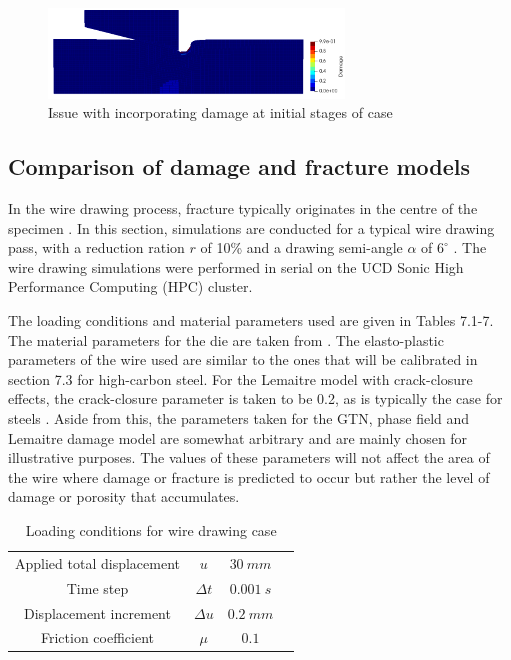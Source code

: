 \documentclass[sn-mathphys,Numbered,draft]{sn-jnl}%
\begin{document}
\begin{figure}[htb]
\begin{center}
	\includegraphics[width=0.7\textwidth]{./Figures/SimulationAndAnalysis/damageIssue.png}
\caption{Issue with incorporating damage at initial stages of case}
\label{fig:notchedRoundBAr}
\end{center}
\end{figure}

\FloatBarrier

\subsection{Comparison of damage and fracture models}

In the wire drawing process, fracture typically originates in the centre of the specimen \cite{gonzalez_assessment_2018,norasethasopon_prediction_2008,hoffmanner_selection_1971,choi_study_2010}. In this section, simulations are conducted for a typical wire drawing pass, with a reduction ration $r$ of 10\% and a drawing semi-angle $\alpha$ of $6^{\circ}$ \cite{roh_process_2021}. The wire drawing simulations were performed in serial on the UCD Sonic High Performance Computing (HPC) cluster.

The loading conditions and material parameters used are given in Tables 7.1-7. The material parameters for the die are taken from \citet{clancy_improving_2019}. The elasto-plastic parameters of the wire used are similar to the ones that will be calibrated in section 7.3 for high-carbon steel. For the Lemaitre model with crack-closure effects, the crack-closure parameter is taken to be 0.2, as is typically the case for steels \cite{desmorat_modeling_2008,lemaitre_course_1996,bouchard_enhanced_2011}. Aside from this, the parameters taken for the GTN, phase field and Lemaitre damage model are somewhat arbitrary and are mainly chosen for illustrative purposes. The values of these parameters will not affect the area of the wire where damage or fracture is predicted to occur but rather the level of damage or porosity that accumulates.

\begin{table}[htb]
	\centering
		\begin{tabular}{cccc} \hline
		    Applied total displacement & $u$ & $30\ mm$ \\
		    Time step & $\Delta t$ & $0.001\ s$ \\
			Displacement increment  & $\Delta u$ & $0.2\ mm$   \\
			Friction coefficient & $\mu$ & $0.1$ \\
			\hline
		\end{tabular}
	\caption{Loading conditions for wire drawing case}
	\label{tab:material_properties}
\end{table}
\end{document}
